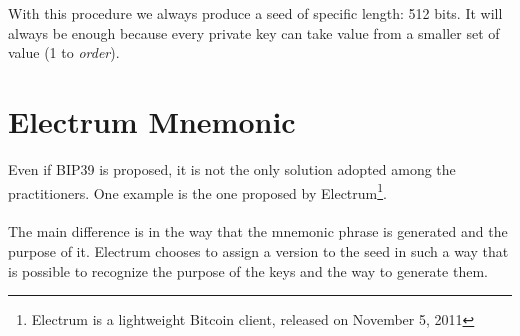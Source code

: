 \begin{remark}
	With this procedure we always produce a seed of specific length: 512 bits. It will always be enough because every private key can take value from a smaller set of value (1 to \textit{order}).
\end{remark}

\section{Electrum Mnemonic}
Even if BIP39 is proposed, it is not the only solution adopted among the practitioners. One example is the one proposed by Electrum\footnote{Electrum is a lightweight Bitcoin client, released on November 5, 2011}.
\\ \\
The main difference is in the way that the mnemonic phrase is generated and the purpose of it. Electrum chooses to assign a version to the seed in such a way that is possible to recognize the purpose of the keys and the way to generate them.

